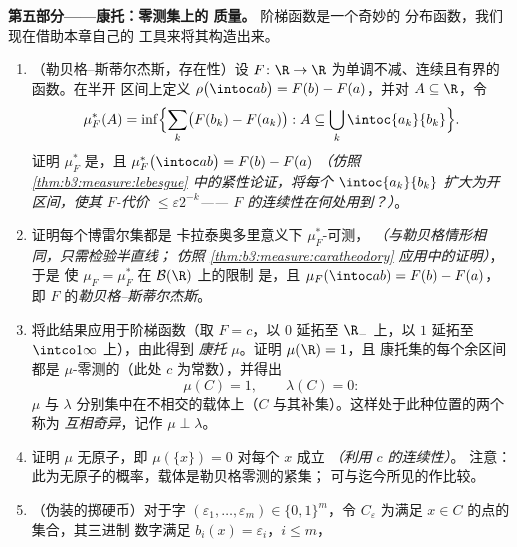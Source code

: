 \begin{problem}
\medskip
\noindent\textbf{第五部分——康托：零测集上的
质量。} 阶梯函数是一个奇妙的
分布函数，我们现在借助本章自己的
工具来将其构造出来。
\begin{enumerate}[resume]
  \item （勒贝格–斯蒂尔杰斯，存在性）设 $F\colon\R\to\R$
        为单调不减、连续且有界的函数。在半开
        区间上定义 $\rho\bigl(\intoc ab\bigr) = F(b) -
        F(a)$，并对 $A \subseteq \R$，令
        \[
        \mu_F^*(A) = \inf\Bigl\{\sum_k\bigl(F(b_k) -
        F(a_k)\bigr) : A \subseteq
        \bigcup_k\intoc{a_k}{b_k}\Bigr\} .
        \]
        证明 $\mu_F^*$ 是，且
        $\mu_F^*\bigl(\intoc ab\bigr) = F(b) - F(a)$
        \emph{（仿照
        \cref{thm:b3:measure:lebesgue} 中的紧性论证，将每个
        $\intoc{a_k}{b_k}$ 扩大为开区间，使其
        $F$-代价 $\leq \varepsilon2^{-k}$——
        $F$ 的连续性在何处用到？）}。
  \item 证明每个博雷尔集都是
        卡拉泰奥多里意义下 $\mu_F^*$-可测，
        \emph{（与勒贝格情形相同，只需检验半直线；
        仿照
        \cref{thm:b3:measure:caratheodory} 应用中的证明）}，于是
        使 $\mu_F = \mu_F^*$ 在 $\mathcal B(\R)$ 上的限制
        是，且 $\mu_F(\intoc ab) = F(b) - F(a)$，
        即 $F$ 的\emph{勒贝格–斯蒂尔杰斯}。
  \item 将此结果应用于阶梯函数（取 $F = c$，以 $0$ 延拓至 $\R_-$
        上，以 $1$ 延拓至 $\intco1\infty$ 上），由此得到
        \emph{康托} $\mu$。证明 $\mu(\R) = 1$，且
        康托集的每个余区间都是 $\mu$-零测的（此处 $c$
        为常数），并得出
        \[
        \mu(C) = 1, \qquad \lambda(C) = 0 :
        \]
        $\mu$ 与 $\lambda$ 分别集中在不相交的载体上（$C$
        与其补集）。这样处于此种位置的两个称为
        \emph{互相奇异}，记作 $\mu \perp
        \lambda$。
  \item 证明 $\mu$ 无原子，即 $\mu(\{x\}) = 0$
        对每个 $x$ 成立 \emph{（利用 $c$ 的连续性）}。
        注意：此为无原子的概率，载体是勒贝格零测的紧集；
        可与迄今所见的作比较。
  \item （伪装的掷硬币）对于字 $(\varepsilon_1,
        \dots, \varepsilon_m) \in \{0,1\}^m$，令
        $C_{\varepsilon}$ 为满足 $x \in C$ 的点的集合，其三进制
        数字满足 $b_i(x) = \varepsilon_i$，$i \leq m$，

\end{enumerate}
\end{problem}
